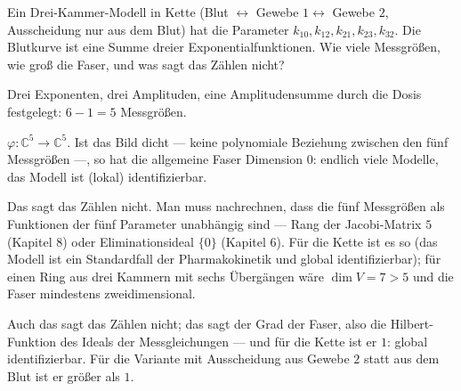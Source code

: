 \begin{aufgabe}
Ein Drei-Kammer-Modell in Kette (Blut $\leftrightarrow$ Gewebe $1\leftrightarrow$ Gewebe $2$, Ausscheidung nur aus dem Blut) hat die Parameter $k_{10}, k_{12}, k_{21}, k_{23}, k_{32}$. Die Blutkurve ist eine Summe dreier Exponentialfunktionen. Wie viele Messgrößen, wie groß die Faser, und was sagt das Zählen nicht?

\loesung
{}
Drei Exponenten, drei Amplituden, eine Amplitudensumme durch die Dosis festgelegt: $6 - 1 = 5$ Messgrößen.

$\varphi\colon\mathbb C^{5}\to\mathbb C^{5}$. Ist das Bild dicht --- keine polynomiale Beziehung zwischen den fünf Messgrößen ---, so hat die allgemeine Faser Dimension $0$: endlich viele Modelle, das Modell ist (lokal) identifizierbar.

Das sagt das Zählen nicht. Man muss nachrechnen, dass die fünf Messgrößen als Funktionen der fünf Parameter unabhängig sind --- Rang der Jacobi-Matrix $5$ (Kapitel 8) oder Eliminationsideal $\{0\}$ (Kapitel 6). Für die Kette ist es so (das Modell ist ein Standardfall der Pharmakokinetik und global identifizierbar); für einen Ring aus drei Kammern mit sechs Übergängen wäre $\dim V = 7 > 5$ und die Faser mindestens zweidimensional.

Auch das sagt das Zählen nicht; das sagt der Grad der Faser, also die Hilbert-Funktion des Ideals der Messgleichungen --- und für die Kette ist er $1$: global identifizierbar. Für die Variante mit Ausscheidung aus Gewebe $2$ statt aus dem Blut ist er größer als $1$.

\begin{center}
\begin{minipage}{0.88\textwidth}
\end{minipage}
\end{center}
\end{aufgabe}

